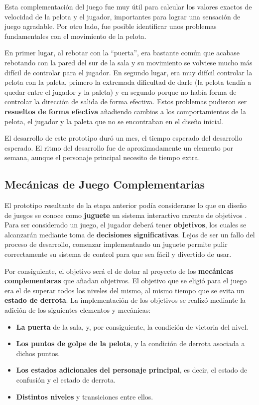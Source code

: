 Esta complementación del juego fue muy útil para calcular los valores exactos de velocidad de la pelota y el jugador, importantes para lograr una sensación de juego agradable. Por otro lado, fue posible identificar unos problemas fundamentales con el movimiento de la pelota. 

En primer lugar, al rebotar con la ``puerta'', era bastante común que acabase rebotando con la pared del sur de la sala y su movimiento se volviese mucho más difícil de controlar para el jugador. En segundo lugar, era muy difícil controlar la pelota con la paleta, primero la extremada dificultad de darle (la pelota tendía a quedar entre el jugador y la paleta) y en segundo porque no había forma de controlar la dirección de salida de forma efectiva. Estos problemas pudieron ser \textbf{resueltos de forma efectiva} añadiendo cambios a los comportamientos de la pelota, el jugador y la paleta que no se encontraban en el diseño inicial. 

El desarrollo de este prototipo duró un mes, el tiempo esperado del desarrollo esperado. El ritmo del desarrollo fue de aproximadamente un elemento por semana, aunque el personaje principal necesito de tiempo extra.

\subsection{Mecánicas de Juego Complementarias}
El prototipo resultante de la etapa anterior podía considerarse lo que en diseño de juegos se conoce como \textbf{juguete} un sistema interactivo carente de objetivos \cite{clockwork_game}. Para ser considerado un juego, el jugador deberá tener \textbf{objetivos}, los cuales se alcanzarán mediante toma de \textbf{decisiones significativas}. Lejos de ser un fallo del proceso de desarrollo, comenzar implementando un juguete permite pulir correctamente su sistema de control para que sea fácil y divertido de usar. 

Por consiguiente, el objetivo será el de dotar al proyecto de los \textbf{mecánicas complementaras} que añadan objetivos. El objetivo que se eligió para el juego era el de superar todos los niveles del mismo, al mismo tiempo que se evita un \textbf{estado de derrota}. La implementación de los objetivos se realizó mediante la adición de los siguientes elementos y mecánicas:
\begin{itemize}
\item \textbf{La puerta} de la sala, y, por consiguiente, la condición de victoria del nivel.
\item \textbf{Los puntos de golpe de la pelota}, y la condición de derrota asociada a dichos puntos.
\item \textbf{Los estados adicionales del personaje principal}, es decir, el estado de confusión y el estado de derrota.
\item  \textbf{Distintos niveles} y transiciones entre ellos.
\end{itemize}

